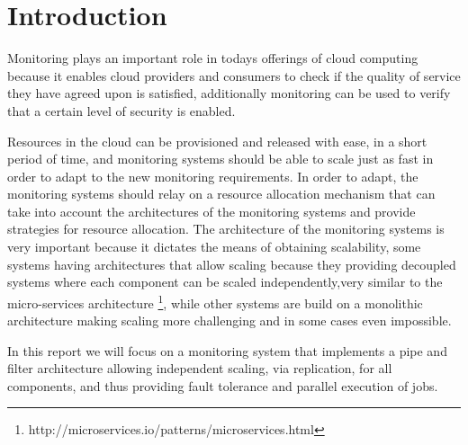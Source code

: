 \section*{Introduction}

Monitoring plays an important role in todays offerings of cloud computing because it enables cloud providers and consumers to check if the quality of service they have agreed upon is satisfied, additionally monitoring can be used to verify that a certain level of security is enabled. 

Resources in the cloud can be provisioned and released with ease, in a short period of time, and monitoring systems should be able to scale just as fast in order to adapt to the new monitoring requirements. In order to adapt, the monitoring systems should relay on a resource allocation mechanism that can take into account the architectures of the monitoring systems and provide strategies for resource allocation. The architecture of the monitoring systems is very important because it dictates the means of obtaining scalability, some systems having architectures that allow scaling because they providing decoupled systems where each component can be scaled independently,very similar to the micro-services architecture \footnote{http://microservices.io/patterns/microservices.html}, while other systems are build on a monolithic architecture making scaling more challenging and in some cases even impossible.

In this report we will focus on a monitoring system that implements a pipe and filter architecture allowing independent scaling, via replication, for all components, and thus providing fault tolerance and parallel execution of jobs.
